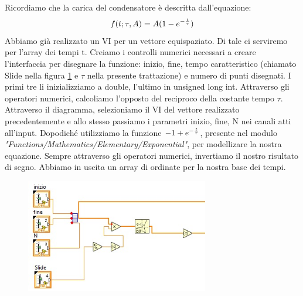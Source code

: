 Ricordiamo che la carica del condensatore è descritta dall'equazione:
\begin{equation}
    f(t; \tau, A) = A (1 - e^{- {t \over{\tau}}})
\end{equation}
Abbiamo già realizzato un VI per un vettore equispaziato. Di tale ci serviremo per l'array dei tempi t.
Creiamo i controlli numerici necessari a creare l'interfaccia per disegnare la funzione: inizio, fine, tempo caratteristico (chiamato Slide nella figura \ref{figura:diagrammaexp} e $\tau$ nella presente trattazione) e numero di punti disegnati. I primi tre li inizializziamo a double, l'ultimo in unsigned long int. 
Attraverso gli operatori numerici, calcoliamo l'opposto del reciproco della costante tempo $\tau$. Attraverso il diagramma, selezioniamo il VI del vettore realizzato precedentemente e allo stesso passiamo i parametri inizio, fine, N nei canali atti all'input. Dopodiché utilizziamo la funzione $- 1 + e^{- {t \over{\tau}}}$, presente nel modulo \textit{"Functions/Mathematics/Elementary/Exponential"}, per modellizare la nostra equazione. Sempre attraverso gli operatori numerici, invertiamo il nostro risultato di segno. Abbiamo in uscita un array di ordinate per la nostra base dei tempi.

\begin{figure}[H]
\caption{}
    \includegraphics[width=8cm]{settimana_1/immagini/esponenziale.jpg}\label{figura:diagrammaexp}
    \centering
\end{figure}

